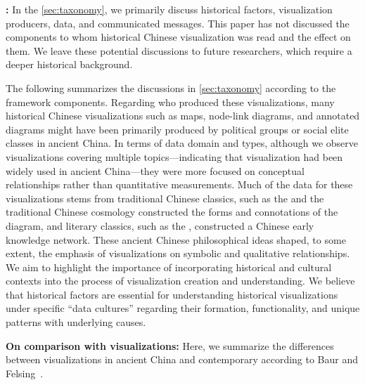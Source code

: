\textbf{:} 
In the \cref{sec:taxonomy}, we primarily discuss historical factors, visualization producers, data, and communicated messages. 
This paper has not discussed the components to whom historical Chinese visualization was read and the effect on them. 
We leave these potential discussions to future researchers, which require a deeper historical background.

The following summarizes the discussions in \cref{sec:taxonomy} according to the framework components.
Regarding who produced these visualizations, many historical Chinese visualizations such as maps, node-link diagrams, and annotated diagrams might have been primarily produced by political groups or social elite classes in ancient China.
In terms of data domain and types, although we observe visualizations covering multiple topics—indicating that visualization had been widely used in ancient China—they were more focused on conceptual relationships rather than quantitative measurements.
Much of the data for these visualizations stems from traditional Chinese classics, such as the  and the traditional Chinese cosmology constructed the forms and connotations of the  diagram, and literary classics, such as the \term{\ShiJing}, constructed a Chinese early knowledge network.
These ancient Chinese philosophical ideas shaped, to some extent, the emphasis of visualizations on symbolic and qualitative relationships.
We aim to highlight the importance of incorporating historical and cultural contexts into the process of visualization creation and understanding.
We believe that historical factors are essential for understanding historical visualizations under specific ``data cultures'' regarding their formation, functionality, and unique patterns with underlying causes.


\textbf{On comparison with  visualizations:}
Here, we summarize the differences between visualizations in ancient China and contemporary according to Baur and Felsing~\cite{Baur2020Visual}.

